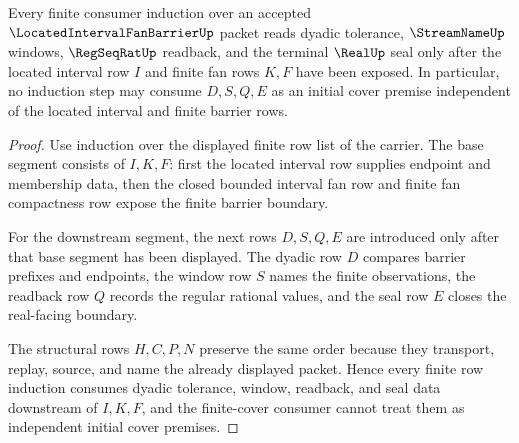\begin{theorem}
\label{thm:located-interval-fan-barrier-dyadic-window-induction}
Every finite consumer induction over an accepted $\LocatedIntervalFanBarrierUp$ packet reads dyadic tolerance, $\StreamNameUp$ windows, $\RegSeqRatUp$ readback, and the terminal $\RealUp$ seal only after the located interval row $I$ and finite fan rows $K,F$ have been exposed. In particular, no induction step may consume $D,S,Q,E$ as an initial cover premise independent of the located interval and finite barrier rows.
\end{theorem}
\begin{proof}
Use induction over the displayed finite row list of the carrier. The base segment consists of $I,K,F$: first the located interval row supplies endpoint and membership data, then the closed bounded interval fan row and finite fan compactness row expose the finite barrier boundary.

For the downstream segment, the next rows $D,S,Q,E$ are introduced only after that base segment has been displayed. The dyadic row $D$ compares barrier prefixes and endpoints, the window row $S$ names the finite observations, the readback row $Q$ records the regular rational values, and the seal row $E$ closes the real-facing boundary.

The structural rows $H,C,P,N$ preserve the same order because they transport, replay, source, and name the already displayed packet. Hence every finite row induction consumes dyadic tolerance, window, readback, and seal data downstream of $I,K,F$, and the finite-cover consumer cannot treat them as independent initial cover premises.
\end{proof}


